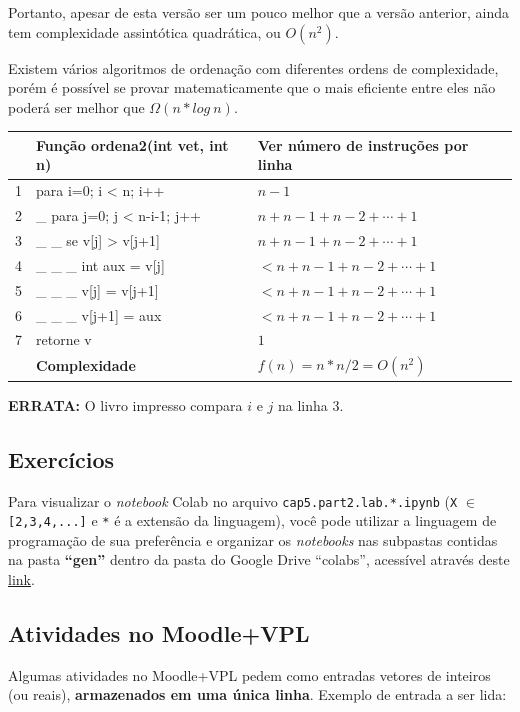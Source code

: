 \documentclass[12pt,a4paper]{article}
\begin{document}
Portanto, apesar de esta versão ser um pouco melhor que a versão
anterior, ainda tem complexidade assintótica quadrática, ou \(O(n^2)\).

Existem vários algoritmos de ordenação com diferentes ordens de
complexidade, porém é possível se provar matematicamente que o mais
eficiente entre eles não poderá ser melhor que \(\Omega(n*log \ n)\).

    \begin{longtable}[]{@{}lll@{}}
\toprule
& Função ordena2(int vet, int n) & Ver número de instruções por
linha\tabularnewline
\midrule
\endhead
1 & para i=0; i \textless{} n; i++ & \(n-1\)\tabularnewline
2 & \_ para j=0; j \textless{} n-i-1; j++ &
\(n+n-1+n-2+\cdots+1\)\tabularnewline
3 & \_ \_ se v{[}j{]} \textgreater{} v{[}j+1{]} &
\(n+n-1+n-2+\cdots+1\)\tabularnewline
4 & \_ \_ \_ int aux = v{[}j{]} &
\(< n+n-1+n-2+\cdots+1\)\tabularnewline
5 & \_ \_ \_ v{[}j{]} = v{[}j+1{]} &
\(< n+n-1+n-2+\cdots+1\)\tabularnewline
6 & \_ \_ \_ v{[}j+1{]} = aux & \(< n+n-1+n-2+\cdots+1\)\tabularnewline
7 & retorne v & \(1\)\tabularnewline
& \textbf{Complexidade} & \(f(n)=n*n/2=O(n^2)\)\tabularnewline
\bottomrule
\end{longtable}

    \textbf{ERRATA:} O livro impresso compara \(i\) e \(j\) na linha 3.

    \hypertarget{exercuxedcios}{%
\subsection{Exercícios}\label{exercuxedcios}}

    Para visualizar o \emph{notebook} Colab no arquivo
\texttt{cap5.part2.lab.*.ipynb} (\texttt{X} \(\in\)
\texttt{{[}2,3,4,...{]}} e \texttt{*} é a extensão da linguagem), você
pode utilizar a linguagem de programação de sua preferência e organizar
os \emph{notebooks} nas subpastas contidas na pasta \textbf{``gen''}
dentro da pasta do Google Drive ``colabs'', acessível através deste
\href{https://drive.google.com/drive/folders/1YlFwv8XYN7PYYf-HwDMlkxzbmXzJw9cM?usp=sharing}{link}.

    \hypertarget{atividades-no-moodlevpl}{%
\subsection{Atividades no Moodle+VPL}\label{atividades-no-moodlevpl}}

Algumas atividades no Moodle+VPL pedem como entradas vetores de inteiros
(ou reais), \textbf{armazenados em uma única linha}. Exemplo de entrada
a ser lida:
\end{document}
